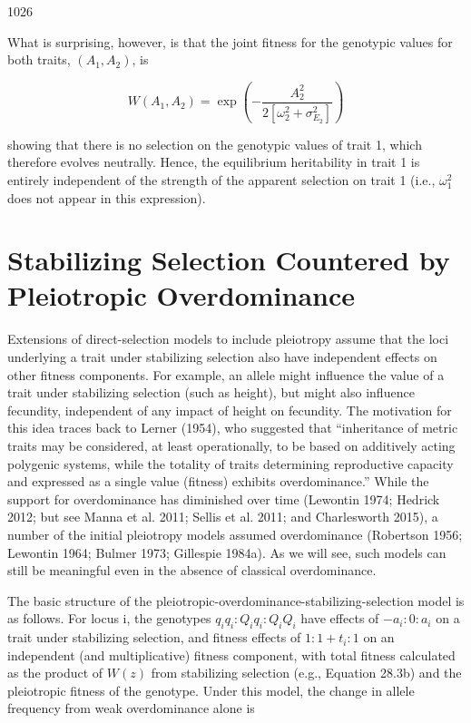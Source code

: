 \documentclass{article}
\begin{document}
1026

What is surprising, however, is that the joint fitness for the genotypic values for both traits,  $ (A_{1}, A_{2}) $, is

\begin{equation}
W(A_{1},A_{2})=\exp\left(-\frac{A_{2}^{2}}{2[\omega_{2}^{2}+\sigma_{E_{2}}^{2}]}\right)
\tag{28.6}
\label{eq:28_6}
\end{equation}

showing that there is no selection on the genotypic values of trait 1, which therefore evolves neutrally. Hence, the equilibrium heritability in trait 1 is entirely independent of the strength of the apparent selection on trait 1 (i.e.,  $ \omega_1^2 $ does not appear in this expression).

\section{Stabilizing Selection Countered by Pleiotropic Overdominance}
Extensions of direct-selection models to include pleiotropy assume that the loci underlying a trait under stabilizing selection also have independent effects on other fitness components. For example, an allele might influence the value of a trait under stabilizing selection (such as height), but might also influence fecundity, independent of any impact of height on fecundity. The motivation for this idea traces back to Lerner (1954), who suggested that “inheritance of metric traits may be considered, at least operationally, to be based on additively acting polygenic systems, while the totality of traits determining reproductive capacity and expressed as a single value (fitness) exhibits overdominance.” While the support for overdominance has diminished over time (Lewontin 1974; Hedrick 2012; but see Manna et al. 2011; Sellis et al. 2011; and Charlesworth 2015), a number of the initial pleiotropy models assumed overdominance (Robertson 1956; Lewontin 1964; Bulmer 1973; Gillespie 1984a). As we will see, such models can still be meaningful even in the absence of classical overdominance.

The basic structure of the pleiotropic-overdominance-stabilizing-selection model is as follows. For locus i, the genotypes  $ q_i q_i : Q_i q_i : Q_i Q_i $ have effects of  $ -a_i : 0 : a_i $ on a trait under stabilizing selection, and fitness effects of  $ 1 : 1 + t_i : 1 $ on an independent (and multiplicative) fitness component, with total fitness calculated as the product of  $ W(z) $ from stabilizing selection (e.g., Equation 28.3b) and the pleiotropic fitness of the genotype. Under this model, the change in allele frequency from weak overdominance alone is
\end{document}
